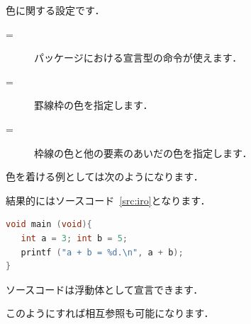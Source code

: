 色に関する設定です．
\begin{description}
 \item[\str=] 
    パッケージにおける宣言型の命令が使えます．
 \item[\str=] 
    罫線枠の色を指定します．
 \item[\str=]
    枠線の色と他の要素のあいだの色を指定します．
\end{description}

色を着ける例としては次のようになります．

\begin{InTeX}
[frame=single,backgroundcolor={\color[gray]{.85}},
rulecolor={\color[cmyk]{0,1,1,.3}},language={C}]
\end{InTeX}

結果的にはソースコード~\ref{src:iro}となります．

\begin{lstlisting}[language={C},frame=single,framerule=.4pt,caption={色の調整},backgroundcolor={\color[gray]{.85}},rulecolor={\color[cmyk]{0,1,1,.3}},label=src:iro]
void main (void){
   int a = 3; int b = 5;
   printf ("a + b = %d.\n", a + b);
} 
\end{lstlisting}

ソースコードは浮動体として宣言できます．

\begin{InTeX}

\end{InTeX}

%
このようにすれば相互参照も可能になります．

